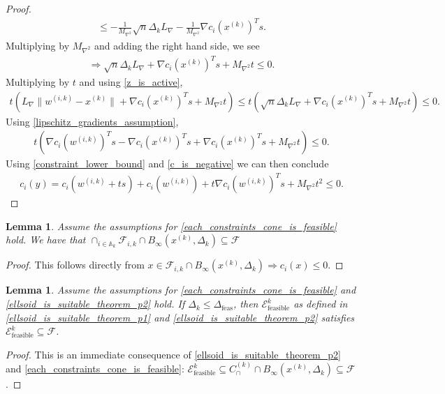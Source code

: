 \documentclass{article}
\newtheorem{lemma}[theorem]{Lemma}
\theoremstyle{case}
\newcommand{\lipgrad}{{L_{\nabla}}}
\newcommand{\maxhessian}{{M_{\nabla^2}}}
\newcommand{\xk}{{x^{(k)}}}
\newcommand{\dk}{\Delta_k}
\newcommand{\feasible}{{\mathcal F}}
\newcommand{\unshiftedellipsoid}{{\mathcal E^k_{\text{feasible}}}}
\newcommand{\dfeas}{{\Delta_{\text{feas}}}}
\newcommand{\fik}{{\mathcal F_{i, k}}}
\newcommand{\wik}{{w^{(i, k)}}}
\newcommand{\capcones}{{C^{(k)}_{\cap}}}
\newcommand{\tr}{{ B_{\infty}\left(\xk, \dk\right) }}
\newcommand{\activeconstraintsk}{{\mathbb A_{k}}}
\begin{document}
\begin{proof}
\begin{align*}
\le -\frac 1 \maxhessian \sqrt{n}\dk \lipgrad -\frac 1 \maxhessian \nabla c_i(\xk)^Ts.
\end{align*}
Multiplying by $\maxhessian$ and adding the right hand side, we see
\begin{align*}
\Longrightarrow \sqrt{n}\dk \lipgrad + \nabla c_i(\xk)^Ts + \maxhessian t \le 0.
\end{align*}
Multiplying by $t$ and using \cref{z_is_active},
\begin{align*}
 t \left(\lipgrad\|\wik - \xk\| + \nabla c_i(\xk)^Ts + \maxhessian t\right) \le t \left(\sqrt{n}\dk \lipgrad + \nabla c_i(\xk)^Ts + \maxhessian t\right) \le 0.
\end{align*}
Using \cref{lipschitz_gradients_assumption},
\begin{align*}
t \left(\nabla c_i(\wik)^Ts - \nabla c_i(\xk)^Ts + \nabla c_i(\xk)^Ts + \maxhessian t\right) \le 0.
\end{align*}
Using \cref{constraint_lower_bound} and \cref{c_is_negative} we can then conclude
\begin{align*}
c_i(y) = c_i(\wik + ts) + c_i(\wik) + t\nabla c_i(\wik)^Ts + \maxhessian t^2 \le 0.
\end{align*}

\end{proof}




\begin{lemma}
\label{cone_and_tr_are_feasible}
Assume the assumptions for \cref{each_constraints_cone_is_feasible} hold.
We have that $\cap_{i \in \activeconstraintsk} \fik \cap \tr \subseteq \feasible$ 
\end{lemma}


\begin{proof}
This follows directly from $x \in \fik \cap \tr \Longrightarrow c_i(x) \le 0$.
\end{proof}


\begin{lemma}
\label{ellipsoid_is_feaisble}
Assume the assumptions for \cref{each_constraints_cone_is_feasible} and \cref{ellsoid_is_suitable_theorem_p2} hold.
If $\dk \le \dfeas$, then $\unshiftedellipsoid$ as defined in \cref{ellsoid_is_suitable_theorem_p1} and \cref{ellsoid_is_suitable_theorem_p2} satisfies
$\unshiftedellipsoid \subseteq \feasible$.
\end{lemma}

\begin{proof}
This is an immediate consequence of \cref{ellsoid_is_suitable_theorem_p2} and \cref{each_constraints_cone_is_feasible}:
$\unshiftedellipsoid \subseteq \capcones \cap \tr \subseteq \feasible$.
\end{proof}
\end{document}
